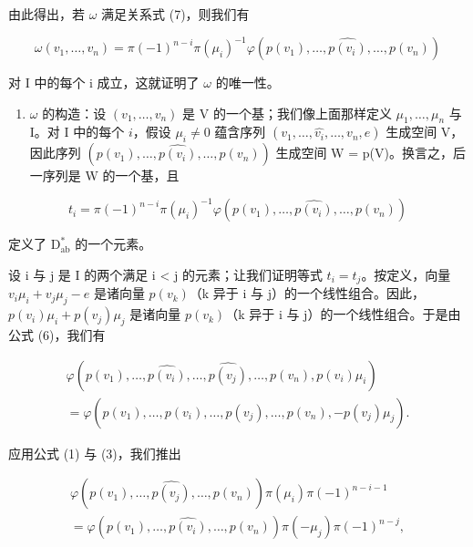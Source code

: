 由此得出，若 \(\omega\) 满足关系式 (7)，则我们有

\[
\omega (v _ {1}, \dots , v _ {n}) = \pi (- 1) ^ {n - i} \pi (\mu_ {i}) ^ {- 1} \varphi (p (v _ {1}), \dots , \widehat {p (v _ {i})}, \dots , p (v _ {n}))\tag{9}
\]

对 I 中的每个 i 成立，这就证明了 \(\omega\) 的唯一性。

\begin{enumerate}
\def\labelenumi{\Alph{enumi})}
\setcounter{enumi}{1}
\tightlist
\item
  \(\omega\) 的构造：设 \((v_{1},\ldots,v_{n})\) 是 V 的一个基；我们像上面那样定义 \(\mu_{1},\ldots,\mu_{n}\) 与 I。对 I 中的每个 \(i\)，假设 \(\mu_{i}\neq0\) 蕴含序列 \((v_{1},\ldots,\widehat{v_{i}},\ldots,v_{n},e)\) 生成空间 V，因此序列 \((p(v_{1}),\ldots,\widehat{p(v_{i})},\ldots,p(v_{n}))\) 生成空间 W = p(V)。换言之，后一序列是 W 的一个基，且
\end{enumerate}

\[
t _ {i} = \pi (- 1) ^ {n - i} \pi (\mu_ {i}) ^ {- 1} \varphi (p (v _ {1}), \ldots , \widehat {p (v _ {i})}, \ldots , p (v _ {n}))\tag{10}
\]

定义了 \(\mathrm{D}_{\mathrm{ab}}^{*}\) 的一个元素。

设 i 与 j 是 I 的两个满足 i \textless{} j 的元素；让我们证明等式 \(t_{i} = t_{j}\)。按定义，向量 \(v_{i}\mu_{i} + v_{j}\mu_{j} - e\) 是诸向量 \(p(v_{k})\)（k 异于 i 与 j）的一个线性组合。因此，\(p(v_{i})\mu_{i} + p(v_{j})\mu_{j}\) 是诸向量 \(p(v_{k})\)（k 异于 i 与 j）的一个线性组合。于是由公式 (6)，我们有

\[
\begin{array}{c} \varphi (p (v _ {1}), \ldots , \widehat {p (v _ {i})}, \ldots , \widehat {p (v _ {j})}, \ldots , p (v _ {n}), p (v _ {i}) \mu_ {i}) \\ = \varphi (p (v _ {1}), \ldots , \widehat {p (v _ {i})}, \ldots , \widehat {p (v _ {j})}, \ldots , p (v _ {n}), - p (v _ {j}) \mu_ {j}). \end{array}
\]

应用公式 (1) 与 (3)，我们推出

\[
\begin{array}{c} \varphi (p (v _ {1}), \ldots , \widehat {p (v _ {j})}, \ldots , p (v _ {n})) \pi (\mu_ {i}) \pi (- 1) ^ {n - i - 1} \\ = \varphi (p (v _ {1}), \ldots , \widehat {p (v _ {i})}, \ldots , p (v _ {n})) \pi (- \mu_ {j}) \pi (- 1) ^ {n - j}, \end{array}
\]

